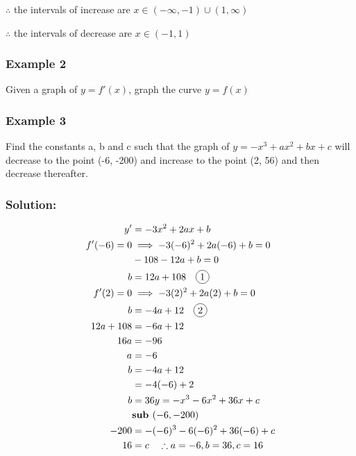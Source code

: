\documentclass{article}
\newcommand*\circled[1]{\tikz[baseline=(char.base)]{
            \node[shape=circle,draw,inner sep=2pt] (char) {#1};}}
\begin{document}
$\therefore$ the intervals of increase are $x\in(-\infty,-1)\cup(1, \infty)$

$\therefore$ the intervals of decrease are $x\in (-1,1)$
\subsubsection{Example 2}
Given a graph of $y=f'(x)$, graph the curve $y=f(x)$

\begin{center}
\end{center}
\subsubsection{Example 3}
Find the constants a, b and c such that the graph of $y=-x^3+ax^2+bx+c$ will decrease to the point (-6, -200) and increase to the point (2, 56) and then decrease thereafter.
\subsubsection*{Solution:}
\begin{align*}
    y'&=-3x^2+2ax+b\\
    f'(-6)=0 &\implies -3(-6)^2+2a(-6)+b=0\\
    &-108-12a+b=0\\
    b&=12a+108 \quad \circled{1}\\
    f'(2)=0 &\implies -3(2)^2+2a(2)+b=0\\
    b&=-4a+12 \quad \circled{2}\\
    12a+108&=-6a+12\\
    16a&=-96\\
    a&=-6\\
    b&=-4a+12\\
    &=-4(-6)+2\\
    b&=36
    y=-x^3-6x^2+36x+c\\
    &\textbf{sub } (-6,-200)\\
    -200&=-(-6)^3-6(-6)^2+36(-6)+c\\
    16&=c \quad \therefore a=-6, b=36, c=16
\end{align*}
\end{document}
